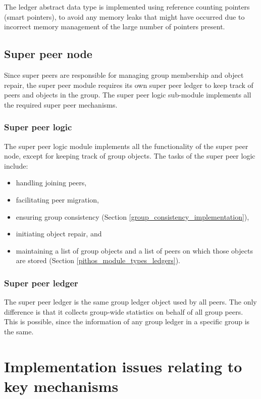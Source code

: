 The ledger abstract data type is implemented using reference counting pointers (smart pointers), to avoid any memory leaks that might have occurred due to incorrect memory management of the large number of pointers present.

\subsection{Super peer node}
\label{pithos_module_types_sp_logic}

Since super peers are responsible for managing group membership and object repair, the super peer module requires its own super peer ledger to keep track of peers and objects in the group. The super peer logic sub-module implements all the required super peer mechanisms.

\subsubsection{Super peer logic}
The super peer logic module implements all the functionality of the super peer node, except for keeping track of group objects. The tasks of the super peer logic include:
\begin{itemize}
\item handling joining peers,
\item facilitating peer migration,
\item ensuring group consistency (Section \ref{group_consistency_implementation}),
\item initiating object repair, and
\item maintaining a list of group objects and a list of peers on which those objects are stored (Section \ref{pithos_module_types_ledgers}).
\end{itemize}

\subsubsection{Super peer ledger}

The super peer ledger is the same group ledger object used by all peers. The only difference is that it collects group-wide statistics on behalf of all group peers. This is possible, since the information of any group ledger in a specific group is the same.

\section{Implementation issues relating to key mechanisms}
\label{key_mechanisms}

